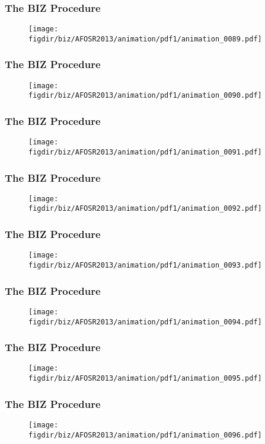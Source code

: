 \documentclass[13pt]{beamer}
\newcommand{\figdir}{../../fig}
\begin{document}
{\begin{frame}\frametitle{The BIZ Procedure}\begin{figure}\texttt{[image: \\figdir/biz/AFOSR2013/animation/pdf1/animation\_0089.pdf]}\end{figure}\end{frame}
\begin{frame}\frametitle{The BIZ Procedure}\begin{figure}\texttt{[image: \\figdir/biz/AFOSR2013/animation/pdf1/animation\_0090.pdf]}\end{figure}\end{frame}
\begin{frame}\frametitle{The BIZ Procedure}\begin{figure}\texttt{[image: \\figdir/biz/AFOSR2013/animation/pdf1/animation\_0091.pdf]}\end{figure}\end{frame}
\begin{frame}\frametitle{The BIZ Procedure}\begin{figure}\texttt{[image: \\figdir/biz/AFOSR2013/animation/pdf1/animation\_0092.pdf]}\end{figure}\end{frame}
\begin{frame}\frametitle{The BIZ Procedure}\begin{figure}\texttt{[image: \\figdir/biz/AFOSR2013/animation/pdf1/animation\_0093.pdf]}\end{figure}\end{frame}
\begin{frame}\frametitle{The BIZ Procedure}\begin{figure}\texttt{[image: \\figdir/biz/AFOSR2013/animation/pdf1/animation\_0094.pdf]}\end{figure}\end{frame}
\begin{frame}\frametitle{The BIZ Procedure}\begin{figure}\texttt{[image: \\figdir/biz/AFOSR2013/animation/pdf1/animation\_0095.pdf]}\end{figure}\end{frame}
\begin{frame}\frametitle{The BIZ Procedure}\begin{figure}\texttt{[image: \\figdir/biz/AFOSR2013/animation/pdf1/animation\_0096.pdf]}\end{figure}\end{frame}
}
\end{document}
